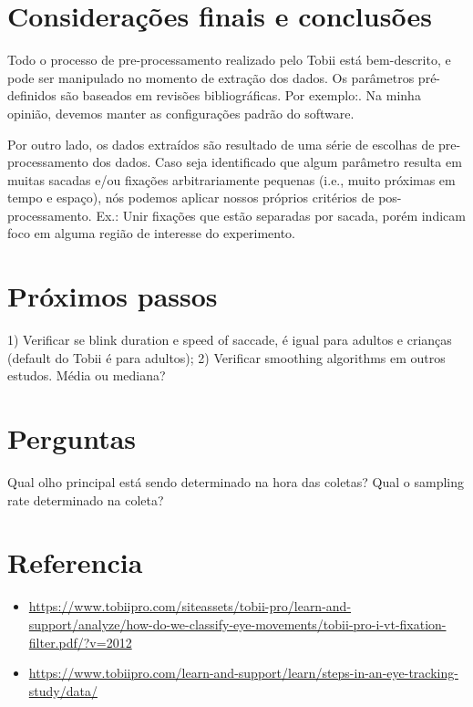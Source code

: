 \documentclass{article}
\begin{document}
\section{Considerações finais e conclusões}
Todo o processo de pre-processamento realizado pelo Tobii está bem-descrito, e pode ser manipulado no momento de extração dos dados.
Os parâmetros pré-definidos são baseados em revisões bibliográficas. Por exemplo:. Na minha opinião, devemos manter as configurações padrão do software.

Por outro lado, os dados extraídos são resultado de uma série de escolhas de pre-processamento dos dados. Caso seja identificado que algum parâmetro resulta em muitas sacadas e/ou fixações arbitrariamente pequenas (i.e., muito próximas em tempo e espaço), nós podemos aplicar nossos próprios critérios de pos-processamento. Ex.: Unir fixações que estão separadas por sacada, porém indicam foco em alguma região de interesse do experimento.

\section{Próximos passos}

1) Verificar se blink duration e speed of saccade, é igual para adultos e crianças (default do Tobii é para adultos); 2) Verificar smoothing algorithms em outros estudos. Média ou mediana?

\section{Perguntas}

Qual olho principal está sendo determinado na hora das coletas?
Qual o sampling rate determinado na coleta?

\section{Referencia}
\begin{itemize}
  \item \url{https://www.tobiipro.com/siteassets/tobii-pro/learn-and-support/analyze/how-do-we-classify-eye-movements/tobii-pro-i-vt-fixation-filter.pdf/?v=2012}
  \item \url{https://www.tobiipro.com/learn-and-support/learn/steps-in-an-eye-tracking-study/data/}
\end{itemize}
\end{document}
